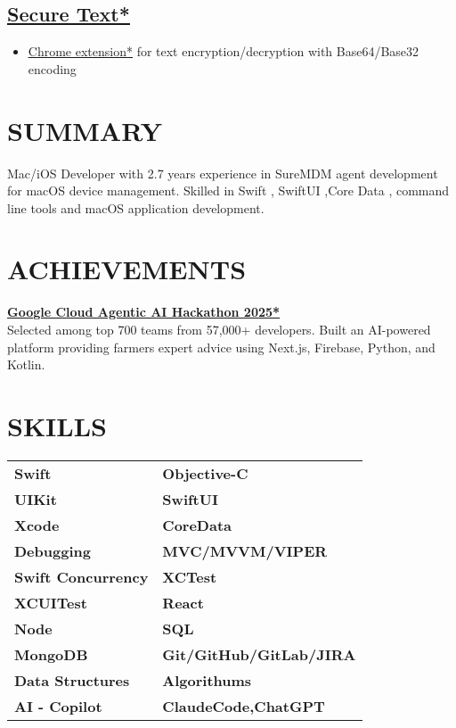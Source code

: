 \documentclass[10pt,a4paper]{moderncv}
\let\oldhref\href
\renewcommand{\href}[2]{\oldhref{#1}{\underline{#2}}}
\begin{document}
\begin{minipage}[t]{0.60\textwidth}
\subsection{\href{https://github.com/sachin6174/secure-text-chrome-extension}{Secure Text*}}
\begin{itemize}
    \item \href{https://chromewebstore.google.com/detail/secure-text/ankgchfieiimiijhlcjcongijapefmei}{Chrome extension*} for text encryption/decryption with Base64/Base32 encoding
\end{itemize}


\end{minipage}
\hfill
\begin{minipage}[t]{0.35\textwidth}
\section{SUMMARY}
Mac/iOS Developer with 2.7 years experience in SureMDM agent development for macOS device management. Skilled in Swift , SwiftUI ,Core Data , command line tools and macOS application development.

\section{ACHIEVEMENTS}
\textbf{\href{https://github.com/abhikumar002/Agentic-Gig-Project}{Google Cloud Agentic AI Hackathon 2025*}} \\
Selected among top 700 teams from 57,000+ developers. Built an AI-powered platform providing farmers expert advice using Next.js, Firebase, Python, and Kotlin.

\section{SKILLS}
\begin{tabularx}{\textwidth}{XX}
\textbf{Swift} & \textbf{Objective-C} \\
\textbf{UIKit} & \textbf{SwiftUI} \\
\textbf{Xcode} & \textbf{CoreData} \\
\textbf{Debugging} & \textbf{MVC/MVVM/VIPER} \\
\textbf{Swift Concurrency} & \textbf{XCTest} \\
\textbf{XCUITest} & \textbf{React} \\
\textbf{Node} & \textbf{SQL} \\
\textbf{MongoDB} & \textbf{Git/GitHub/GitLab/JIRA} \\
\textbf{Data Structures} & \textbf{Algorithums} \\
\textbf{AI - Copilot} & \textbf{ClaudeCode,ChatGPT} \\
\end{tabularx}


\end{minipage}
\end{document}
